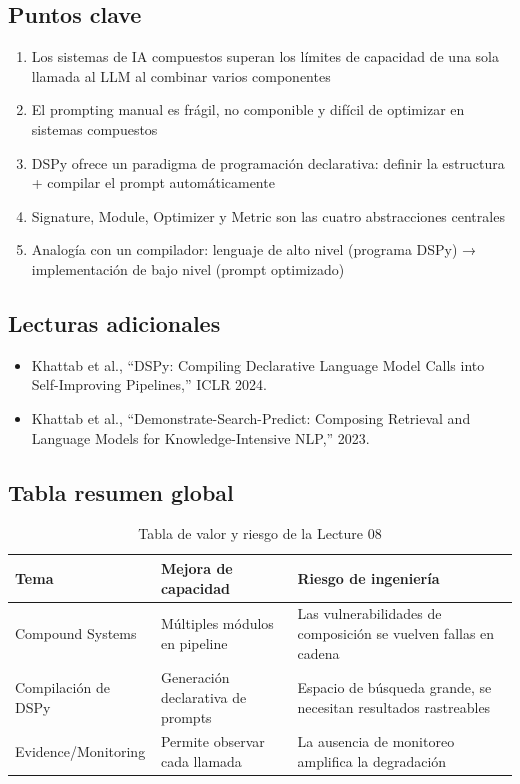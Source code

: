 \documentclass[a4paper]{article}
\begin{document}
\subsection{Puntos clave}

\begin{enumerate}
    \item Los sistemas de IA compuestos superan los límites de capacidad de una sola llamada al LLM al combinar varios componentes
    \item El prompting manual es frágil, no componible y difícil de optimizar en sistemas compuestos
    \item DSPy ofrece un paradigma de programación declarativa: definir la estructura + compilar el prompt automáticamente
    \item Signature, Module, Optimizer y Metric son las cuatro abstracciones centrales
    \item Analogía con un compilador: lenguaje de alto nivel (programa DSPy) → implementación de bajo nivel (prompt optimizado)
\end{enumerate}

\subsection{Lecturas adicionales}

\begin{itemize}
    \item Khattab et al., ``DSPy: Compiling Declarative Language Model Calls into Self-Improving Pipelines,'' ICLR 2024.
    \item Khattab et al., ``Demonstrate-Search-Predict: Composing Retrieval and Language Models for Knowledge-Intensive NLP,'' 2023.
\end{itemize}

\subsection{Tabla resumen global}

\begin{table}[H]
\centering
\begin{tabular}{p{}p{}p{}}
\toprule
Tema & Mejora de capacidad & Riesgo de ingeniería \\
\midrule
Compound Systems & Múltiples módulos en pipeline & Las vulnerabilidades de composición se vuelven fallas en cadena \\
Compilación de DSPy & Generación declarativa de prompts & Espacio de búsqueda grande, se necesitan resultados rastreables \\
Evidence/Monitoring & Permite observar cada llamada & La ausencia de monitoreo amplifica la degradación \\
\bottomrule
\end{tabular}
\caption{Tabla de valor y riesgo de la Lecture 08}
\end{table}
\end{document}
